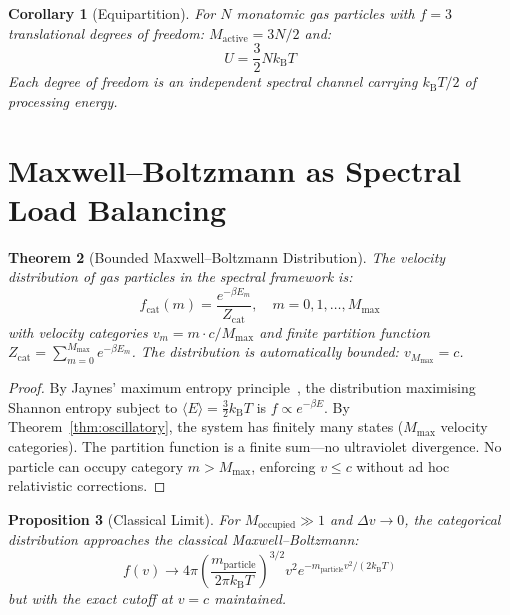 \documentclass[twocolumn,10pt,a4paper]{article}
\theoremstyle{plain}
\newtheorem{theorem}{Theorem}[section]
\newtheorem{proposition}[theorem]{Proposition}
\newtheorem{corollary}[theorem]{Corollary}
\theoremstyle{definition}
\theoremstyle{remark}
\newcommand{\kB}{k_{\mathrm{B}}}
\begin{document}
\begin{corollary}[Equipartition]
For $N$ monatomic gas particles with $f = 3$ translational degrees of freedom: $M_{\mathrm{active}} = 3N/2$ and:
\begin{equation}
    U = \frac{3}{2}N\kB T
\end{equation}
Each degree of freedom is an independent spectral channel carrying $\kB T/2$ of processing energy.
\end{corollary}

\section{Maxwell--Boltzmann as Spectral Load Balancing}
\label{sec:maxwell_boltzmann}

\begin{theorem}[Bounded Maxwell--Boltzmann Distribution]
\label{thm:maxwell}
The velocity distribution of gas particles in the spectral framework is:
\begin{equation}
    f_{\mathrm{cat}}(m) = \frac{e^{-\beta E_m}}{Z_{\mathrm{cat}}}, \quad m = 0, 1, \ldots, M_{\max}
\end{equation}
with velocity categories $v_m = m \cdot c/M_{\max}$ and finite partition function $Z_{\mathrm{cat}} = \sum_{m=0}^{M_{\max}} e^{-\beta E_m}$. The distribution is automatically bounded: $v_{M_{\max}} = c$.
\end{theorem}

\begin{proof}
By Jaynes' maximum entropy principle~\cite{jaynes1957}, the distribution maximising Shannon entropy subject to $\langle E \rangle = \tfrac{3}{2}\kB T$ is $f \propto e^{-\beta E}$. By Theorem~\ref{thm:oscillatory}, the system has finitely many states ($M_{\max}$ velocity categories). The partition function is a finite sum---no ultraviolet divergence. No particle can occupy category $m > M_{\max}$, enforcing $v \leq c$ without ad hoc relativistic corrections.
\end{proof}

\begin{proposition}[Classical Limit]
For $M_{\mathrm{occupied}} \gg 1$ and $\Delta v \to 0$, the categorical distribution approaches the classical Maxwell--Boltzmann:
\begin{equation}
    f(v) \to 4\pi \left(\frac{m_{\mathrm{particle}}}{2\pi \kB T}\right)^{3/2} v^2 e^{-m_{\mathrm{particle}} v^2/(2\kB T)}
\end{equation}
but with the exact cutoff at $v = c$ maintained.
\end{proposition}
\end{document}
